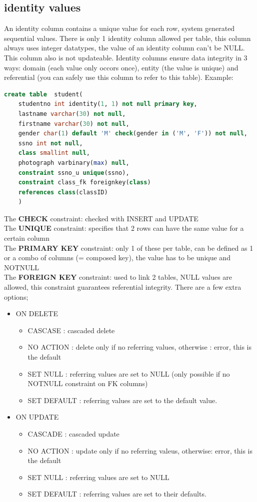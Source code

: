 \documentclass{report}
\begin{document}
	\subsection{identity values}
	An identity column contains a unique value for each row, system generated sequential values. There is only 1 identity column allowed per table, this column always uses integer datatypes, the value of an identity column can't be NULL. This column also is not updateable. 
	Identity columns ensure data integrity in 3 ways: domain (each value only occors once), entity (the value is unique) and referential (you can safely use this column to refer to this table).
	Example: 
	\begin{lstlisting}[language=sql]
	create table  student(
	studentno int identity(1, 1) not null primary key,
	lastname varchar(30) not null,
	firstname varchar(30) not null,
	gender char(1) default 'M' check(gender in ('M', 'F')) not null,
	ssno int not null,
	class smallint null,
	photograph varbinary(max) null,
	constraint ssno_u unique(ssno),
	constraint class_fk foreignkey(class) 
	references class(classID)
	)	\end{lstlisting}
	The \textbf{CHECK} constraint: checked with INSERT and UPDATE \\
	The \textbf{UNIQUE} constraint: specifies that 2 rows can have the same value for a certain column \\
	The \textbf{PRIMARY KEY} constraint: only 1 of these per table, can be defined as 1 or a combo of columns (= composed key), the value has to be unique and NOTNULL \\
	The \textbf{FOREIGN KEY} constraint: used to link 2 tables, NULL values are allowed, this constraint guarantees referential integrity. There are a few extra options; 
	\begin{itemize}
		\item ON DELETE
		\begin{itemize}
			\item CASCASE : cascaded delete
			\item NO ACTION : delete only if no referring values, otherwise : error, this is the default
			\item SET NULL : referring values are set to NULL (only possible if no NOTNULL constraint on FK columns)
			\item SET DEFAULT : referring values are set to the default value. 
		\end{itemize}
		\item ON UPDATE
		\begin{itemize}
			\item CASCADE : cascaded update
			\item NO ACTION : update only if no referring valeus, otherwise: error, this is the default
			\item SET NULL : referring values are set to NULL
			\item SET DEFAULT : referring values are set to their defaults.
		\end{itemize}
	\end{itemize}	
\end{document}
